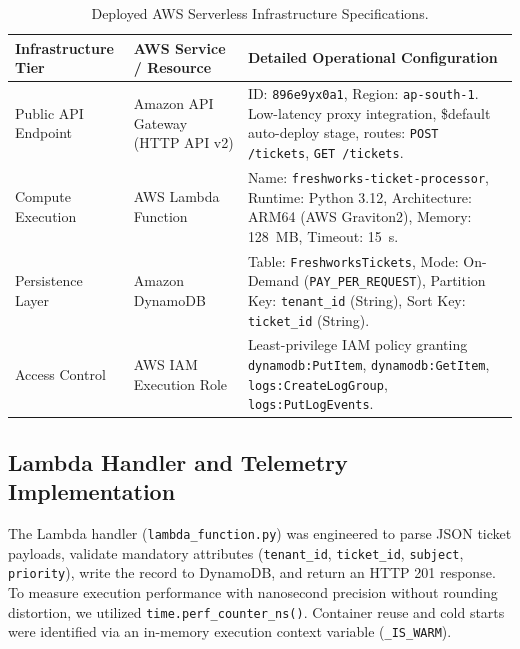 \documentclass[10pt,a4paper]{article}
\begin{document}
\begin{table}[H]
\centering
\caption{Deployed AWS Serverless Infrastructure Specifications.}
\label{tab:infra_specs}
\small
\begin{tabularx}{\textwidth}{l l X}
\toprule
\textbf{Infrastructure Tier} & \textbf{AWS Service / Resource} & \textbf{Detailed Operational Configuration} \\
\midrule
Public API Endpoint & Amazon API Gateway (HTTP API v2) & ID: \texttt{896e9yx0a1}, Region: \texttt{ap-south-1}. Low-latency proxy integration, \$default auto-deploy stage, routes: \texttt{POST /tickets}, \texttt{GET /tickets}. \\
Compute Execution & AWS Lambda Function & Name: \texttt{freshworks-ticket-processor}, Runtime: Python 3.12, Architecture: ARM64 (AWS Graviton2), Memory: 128~MB, Timeout: 15~s. \\
Persistence Layer & Amazon DynamoDB & Table: \texttt{FreshworksTickets}, Mode: On-Demand (\texttt{PAY\_PER\_REQUEST}), Partition Key: \texttt{tenant\_id} (String), Sort Key: \texttt{ticket\_id} (String). \\
Access Control & AWS IAM Execution Role & Least-privilege IAM policy granting \texttt{dynamodb:PutItem}, \texttt{dynamodb:GetItem}, \texttt{logs:CreateLogGroup}, \texttt{logs:PutLogEvents}. \\
\bottomrule
\end{tabularx}
\end{table}

\subsection{Lambda Handler and Telemetry Implementation}
The Lambda handler (\texttt{lambda\_function.py}) was engineered to parse JSON ticket payloads, validate mandatory attributes (\texttt{tenant\_id}, \texttt{ticket\_id}, \texttt{subject}, \texttt{priority}), write the record to DynamoDB, and return an HTTP 201 response. To measure execution performance with nanosecond precision without rounding distortion, we utilized \texttt{time.perf\_counter\_ns()}. Container reuse and cold starts were identified via an in-memory execution context variable (\texttt{\_IS\_WARM}).
\end{document}
